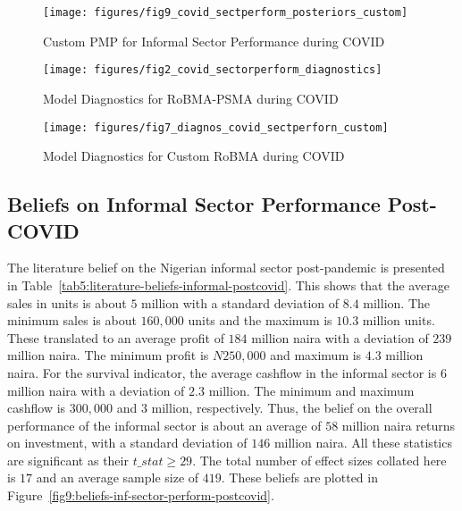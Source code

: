 \documentclass[12pt, english]{article}
\begin{document}
    \begin{figure}[H]
        \centering
        \texttt{[image: figures/fig9\_covid\_sectperform\_posteriors\_custom]}
        \caption{Custom PMP for Informal Sector Performance during COVID}
        \label{fig6:custom-pmp-covid-sectorperform-posteriors}
    \end{figure}

    \begin{figure}[H]
        \centering
        \texttt{[image: figures/fig2\_covid\_sectorperform\_diagnostics]}
        \caption{Model Diagnostics for RoBMA-PSMA during COVID}
        \label{fig7:diagnostics-robma-psma-covid-sectorperform}
    \end{figure}

    \begin{figure}[H]
        \centering
        \texttt{[image: figures/fig7\_diagnos\_covid\_sectperforn\_custom]}
        \caption{Model Diagnostics for Custom RoBMA during COVID}
        \label{fig8:diagnostics-custom-pmp-covid-sectorperform}
    \end{figure}

    \subsection{Beliefs on Informal Sector Performance Post-COVID}\label{subsec4.2:literature-beliefs-on-informal-sector-performance-post-covid-19}
    The literature belief on the Nigerian informal sector post-pandemic is presented in Table~\ref{tab5:literature-beliefs-informal-postcovid}. This shows that the average sales in units is about $5$ million with a standard deviation of $8.4$ million. The minimum sales is about $160,000$ units and the maximum is $10.3$ million units. These translated to an average profit of $184$ million naira with a deviation of $239$ million naira. The minimum profit is $N250,000$ and maximum is $4.3$ million naira. For the survival indicator, the average cashflow in the informal sector is $6$ million naira with a deviation of $2.3$ million. The minimum and maximum cashflow is $300,000$ and $3$ million, respectively. Thus, the belief on the overall performance of the informal sector is about an average of $58$ million naira returns on investment, with a standard deviation of $146$ million naira. All these statistics are significant as their $t\_stat \geq 29$. The total number of effect sizes collated here is $17$ and an average sample size of $419$. These beliefs are plotted in Figure~\ref{fig9:beliefs-inf-sector-perform-postcovid}.
\end{document}
